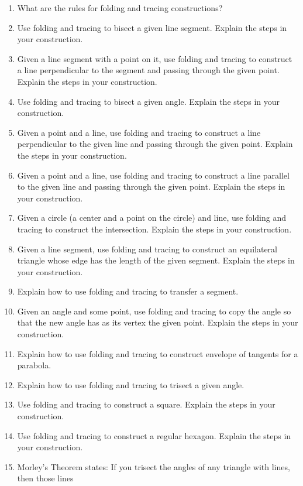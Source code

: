 \begin{problems}
\begin{enumerate}
\item What are the rules for folding and tracing constructions?
\item Use folding and tracing to bisect a given line segment. Explain the steps in
  your construction.
\item Given a line segment with a point on it, use folding and tracing to
  construct a line perpendicular to the segment and passing through
  the given point. Explain the steps in your construction.
\item Use folding and tracing to bisect a given angle. Explain the steps in your
  construction.
\item Given a point and a line, use folding and tracing to construct a line
  perpendicular to the given line and passing through the given
  point. Explain the steps in your construction.
\item Given a point and a line, use folding and tracing to construct a line parallel
  to the given line and passing through the given point. Explain the
  steps in your construction.
\item Given a circle (a center and a point on the circle) and line,
  use folding and tracing to construct the intersection. Explain the steps in your
  construction.
\item Given a line segment, use folding and tracing to construct an equilateral
  triangle whose edge has the length of the given segment. Explain the
  steps in your construction.
\item Explain how to use folding and tracing to transfer a segment.
\item Given an angle and some point, use folding and tracing to copy the angle so
  that the new angle has as its vertex the given point. Explain the
  steps in your construction.
\item Explain how to use folding and tracing to construct envelope of tangents for
  a parabola.
\item Explain how to use folding and tracing to trisect a given angle.
\item Use folding and tracing to construct a square. Explain the steps in your construction.
\item Use folding and tracing to construct a regular hexagon. Explain the steps in
  your construction.
\item Morley's Theorem states:
If you trisect the angles of any triangle with lines, then those lines

\end{enumerate}
\end{problems}
